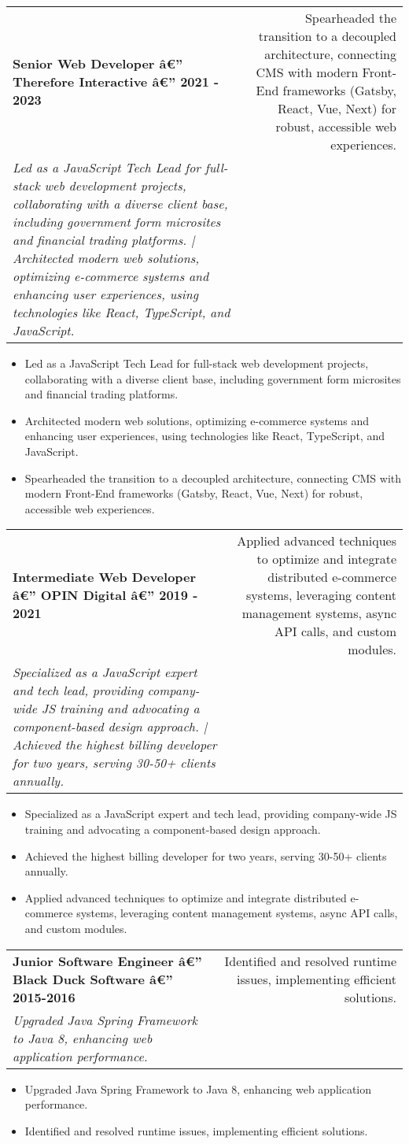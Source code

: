 \documentclass[letterpaper,11pt]{article}
\makeatletter
\newcommand{\resumeItem}[1]{
  \item\small{
    {#1 \vspace{-2pt}}
  }
}
\newcommand{\resumeSubheading}[3]{
  \vspace{-2pt}\item
    \begin{tabular*}{0.97\textwidth}[t]{l@{\extracolsep{\fill}}r}
      \textbf{#1} & #2 \\
      \textit{\small#3} \\
    \end{tabular*}\vspace{-7pt}
}
\newcommand{\resumeItemListStart}{\begin{itemize}}
\newcommand{\resumeItemListEnd}{\end{itemize}\vspace{-5pt}}
\makeatother
\begin{document}
\resumeSubheading
{Senior Web Developer â€” Therefore Interactive â€” 2021 - 2023}
{Spearheaded the transition to a decoupled architecture, connecting CMS with modern Front-End frameworks (Gatsby, React, Vue, Next) for robust, accessible web experiences.}
{Led as a JavaScript Tech Lead for full-stack web development projects, collaborating with a diverse client base, including government form microsites and financial trading platforms. | Architected modern web solutions, optimizing e-commerce systems and enhancing user experiences, using technologies like React, TypeScript, and JavaScript.}
\resumeItemListStart
\resumeItem{Led as a JavaScript Tech Lead for full-stack web development projects, collaborating with a diverse client base, including government form microsites and financial trading platforms.}
\resumeItem{Architected modern web solutions, optimizing e-commerce systems and enhancing user experiences, using technologies like React, TypeScript, and JavaScript.}
\resumeItem{Spearheaded the transition to a decoupled architecture, connecting CMS with modern Front-End frameworks (Gatsby, React, Vue, Next) for robust, accessible web experiences.}
\resumeItemListEnd


\resumeSubheading
{Intermediate Web Developer â€” OPIN Digital â€” 2019 - 2021}
{Applied advanced techniques to optimize and integrate distributed e-commerce systems, leveraging content management systems, async API calls, and custom modules.}
{Specialized as a JavaScript expert and tech lead, providing company-wide JS training and advocating a component-based design approach. | Achieved the highest billing developer for two years, serving 30-50+ clients annually.}
\resumeItemListStart
\resumeItem{Specialized as a JavaScript expert and tech lead, providing company-wide JS training and advocating a component-based design approach.}
\resumeItem{Achieved the highest billing developer for two years, serving 30-50+ clients annually.}
\resumeItem{Applied advanced techniques to optimize and integrate distributed e-commerce systems, leveraging content management systems, async API calls, and custom modules.}
\resumeItemListEnd


\resumeSubheading
{Junior Software Engineer â€” Black Duck Software â€” 2015-2016}
{Identified and resolved runtime issues, implementing efficient solutions.}
{Upgraded Java Spring Framework to Java 8, enhancing web application performance.}
\resumeItemListStart
\resumeItem{Upgraded Java Spring Framework to Java 8, enhancing web application performance.}
\resumeItem{Identified and resolved runtime issues, implementing efficient solutions.}
\resumeItemListEnd
\end{document}
